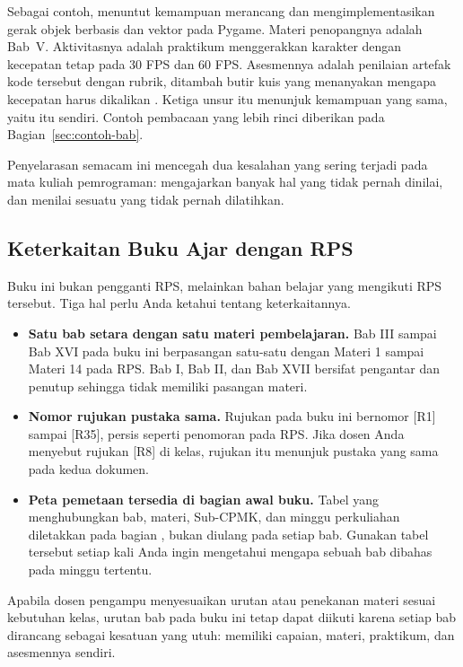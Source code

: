 Sebagai contoh,  menuntut kemampuan merancang dan
mengimplementasikan gerak objek berbasis  dan vektor pada
Pygame. Materi penopangnya adalah Bab~V. Aktivitasnya adalah praktikum
menggerakkan karakter dengan kecepatan tetap pada 30 FPS dan 60 FPS.
Asesmennya adalah penilaian artefak kode tersebut dengan rubrik, ditambah
butir kuis yang menanyakan mengapa kecepatan harus dikalikan
. Ketiga unsur itu menunjuk kemampuan yang sama, yaitu
 itu sendiri. Contoh pembacaan yang lebih rinci diberikan pada
Bagian~\ref{sec:contoh-bab}.

Penyelarasan semacam ini mencegah dua kesalahan yang sering terjadi pada
mata kuliah pemrograman: mengajarkan banyak hal yang tidak pernah dinilai,
dan menilai sesuatu yang tidak pernah dilatihkan.

\subsection{Keterkaitan Buku Ajar dengan RPS}

Buku ini bukan pengganti RPS, melainkan bahan belajar yang mengikuti RPS
tersebut. Tiga hal perlu Anda ketahui tentang keterkaitannya.

\begin{itemize}
  \item \textbf{Satu bab setara dengan satu materi pembelajaran.} Bab III
        sampai Bab XVI pada buku ini berpasangan satu-satu dengan Materi 1
        sampai Materi 14 pada RPS. Bab I, Bab II, dan Bab XVII bersifat
        pengantar dan penutup sehingga tidak memiliki pasangan materi.
  \item \textbf{Nomor rujukan pustaka sama.} Rujukan pada buku ini bernomor
        \mbox{[R1]} sampai \mbox{[R35]}, persis seperti penomoran pada RPS.
        Jika dosen Anda menyebut rujukan \mbox{[R8]} di kelas, rujukan itu
        menunjuk pustaka yang sama pada kedua dokumen.
  \item \textbf{Peta pemetaan tersedia di bagian awal buku.} Tabel yang
        menghubungkan bab, materi, Sub-CPMK, dan minggu perkuliahan diletakkan
        pada bagian , bukan
        diulang pada setiap bab. Gunakan tabel tersebut setiap kali Anda
        ingin mengetahui mengapa sebuah bab dibahas pada minggu tertentu.
\end{itemize}

Apabila dosen pengampu menyesuaikan urutan atau penekanan materi sesuai
kebutuhan kelas, urutan bab pada buku ini tetap dapat diikuti karena setiap
bab dirancang sebagai kesatuan yang utuh: memiliki capaian, materi,
praktikum, dan asesmennya sendiri.

